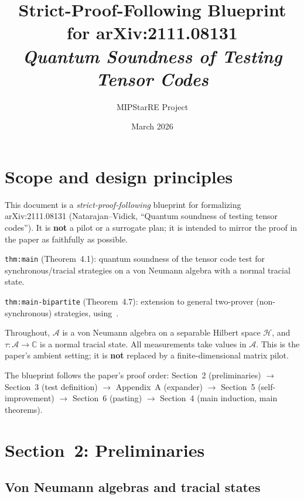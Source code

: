 \documentclass{article}
\title{Strict-Proof-Following Blueprint for arXiv:2111.08131\\
\large\textit{Quantum Soundness of Testing Tensor Codes}}
\author{MIPStarRE Project}
\date{March 2026}
\theoremstyle{remark}
\newcommand{\C}{\mathbb{C}}
\newcommand{\hilb}{\mathcal{H}}
\newcommand{\algebra}{\mathcal{A}}
\begin{document}
\maketitle
\tableofcontents

\section{Scope and design principles}
\label{sec:scope}

This document is a \emph{strict-proof-following} blueprint for formalizing
arXiv:2111.08131 (Natarajan--Vidick, ``Quantum soundness of testing tensor
codes''). It is \textbf{not} a pilot or a surrogate plan; it is intended to
mirror the proof in the paper as faithfully as possible.

\begin{description}[style=nextline,leftmargin=2.5cm]
	\item[Primary target]
	      \texttt{thm:main} (Theorem~4.1): quantum soundness of the tensor code test
	      for synchronous/tracial strategies on a von Neumann algebra with a normal
	      tracial state.
	\item[Secondary target]
	      \texttt{thm:main-bipartite} (Theorem~4.7): extension to general two-prover
	      (non-synchronous) strategies, using~\cite{vidick2021almost}.
	\item[Ambient setting]
	      Throughout, $\algebra$ is a von Neumann algebra on a separable Hilbert space
	      $\hilb$, and $\tau\colon\algebra\to\C$ is a normal tracial state.
	      All measurements take values in $\algebra$. This is the paper's ambient
	      setting; it is \textbf{not} replaced by a finite-dimensional matrix pilot.
	\item[Proof order]
	      The blueprint follows the paper's proof order:
	      Section~2 (preliminaries) $\to$ Section~3 (test definition) $\to$
	      Appendix~A (expander) $\to$ Section~5 (self-improvement) $\to$
	      Section~6 (pasting) $\to$ Section~4 (main induction, main theorems).
\end{description}

\section{Section~2: Preliminaries}
\label{sec:prelims}

\subsection{Von Neumann algebras and tracial states}
\end{document}

